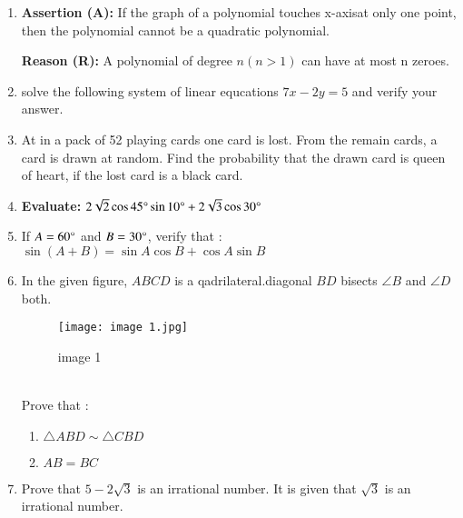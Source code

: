 \documentclass[12pt,-letter paper]{article}
\providecommand{\brak}[1]{\ensuremath{\left(#1\right)}}
\begin{document}
\begin{enumerate}
\item \textbf{Assertion (A):} If the graph of a polynomial touches x-axisat only one point, then the polynomial cannot be a quadratic polynomial.

	\textbf{Reason (R):} A polynomial of degree $n\brak{n > 1}$ can have at most n zeroes.
\item solve the following system of linear equcations $7x-2y=5$ and verify your answer.
\item At in a pack of 52 playing cards one card is lost. From the remain cards, a card is drawn at random.
Find the probability that the drawn card is queen of heart, if the lost card is a black card.
\item\textbf{ Evaluate:} $2\sqrt{2} \cos 45\degree \sin 10\degree + 2\sqrt{3} \cos 30\degree$

\item If  $A = 60\degree$ and  $B = 30\degree$, verify that : $\sin\brak{A + B} = \sin A \cos B + \cos A \sin B$

\item In  the given figure, $ABCD$ is a qadrilateral.diagonal $BD$ bisects $\angle B$ and $\angle D$ both. 
\begin{figure}[!ht]
\centering
\texttt{[image: image 1.jpg]}
\label{fig:image 1}
\caption{image 1}
\end{figure}\\
\text Prove that :\\	
\begin{enumerate}	
\item$\triangle ABD \sim \triangle CBD $\\
\item $AB = BC$
\end{enumerate}
\newpage
\item Prove that $ 5 - 2\sqrt{3}$ is an irrational number. It is given that $\sqrt{3}$  is an irrational number.


\end{enumerate}
\end{document}
